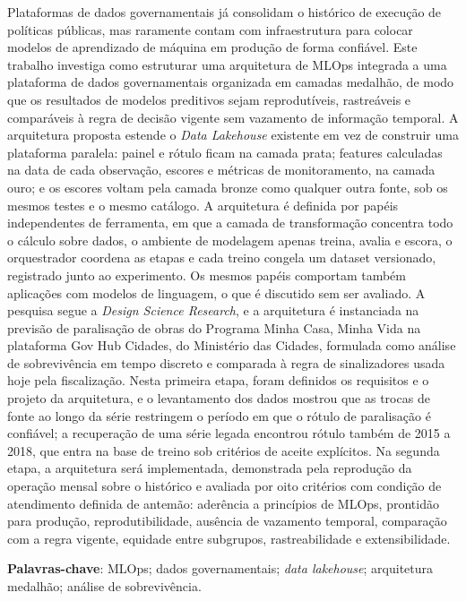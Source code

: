 \begin{resumo}
 Plataformas de dados governamentais já consolidam o histórico de execução de políticas públicas, mas raramente contam com infraestrutura para colocar modelos de aprendizado de máquina em produção de forma confiável. Este trabalho investiga como estruturar uma arquitetura de MLOps integrada a uma plataforma de dados governamentais organizada em camadas medalhão, de modo que os resultados de modelos preditivos sejam reprodutíveis, rastreáveis e comparáveis à regra de decisão vigente sem vazamento de informação temporal. A arquitetura proposta estende o \textit{Data Lakehouse} existente em vez de construir uma plataforma paralela: painel e rótulo ficam na camada prata; features calculadas na data de cada observação, escores e métricas de monitoramento, na camada ouro; e os escores voltam pela camada bronze como qualquer outra fonte, sob os mesmos testes e o mesmo catálogo. A arquitetura é definida por papéis independentes de ferramenta, em que a camada de transformação concentra todo o cálculo sobre dados, o ambiente de modelagem apenas treina, avalia e escora, o orquestrador coordena as etapas e cada treino congela um dataset versionado, registrado junto ao experimento. Os mesmos papéis comportam também aplicações com modelos de linguagem, o que é discutido sem ser avaliado. A pesquisa segue a \textit{Design Science Research}, e a arquitetura é instanciada na previsão de paralisação de obras do Programa Minha Casa, Minha Vida na plataforma Gov Hub Cidades, do Ministério das Cidades, formulada como análise de sobrevivência em tempo discreto e comparada à regra de sinalizadores usada hoje pela fiscalização. Nesta primeira etapa, foram definidos os requisitos e o projeto da arquitetura, e o levantamento dos dados mostrou que as trocas de fonte ao longo da série restringem o período em que o rótulo de paralisação é confiável; a recuperação de uma série legada encontrou rótulo também de 2015 a 2018, que entra na base de treino sob critérios de aceite explícitos. Na segunda etapa, a arquitetura será implementada, demonstrada pela reprodução da operação mensal sobre o histórico e avaliada por oito critérios com condição de atendimento definida de antemão: aderência a princípios de MLOps, prontidão para produção, reprodutibilidade, ausência de vazamento temporal, comparação com a regra vigente, equidade entre subgrupos, rastreabilidade e extensibilidade.

 \vspace{\onelineskip}

 \noindent
 \textbf{Palavras-chave}: MLOps; dados governamentais; \textit{data lakehouse}; arquitetura medalhão; análise de sobrevivência.
\end{resumo}

